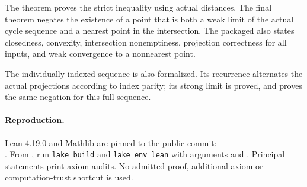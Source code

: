 \documentclass[11pt]{article}
\begin{document}
The theorem  proves the strict inequality using actual distances. The final theorem  negates the existence of a point that is both a weak limit of the actual cycle sequence and a nearest point in the intersection. The packaged  also states closedness, convexity, intersection nonemptiness, projection correctness for all inputs, and weak convergence to a nonnearest point.

The individually indexed sequence  is also formalized. Its recurrence alternates the actual projections according to index parity; its strong limit is proved, and  proves the same negation for this full sequence.

\paragraph{Reproduction.}
Lean 4.19.0 and Mathlib are pinned to the public commit:\\
.
From , run \texttt{lake build} and \texttt{lake env lean} with arguments  and . Principal statements print axiom audits. No admitted proof, additional axiom or computation-trust shortcut is used.
\end{document}
